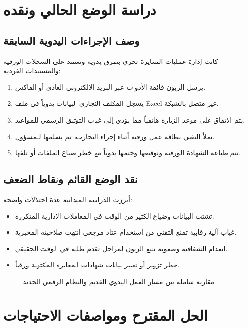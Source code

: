 \documentclass{bts-report-ar}
\begin{document}
\section{دراسة الوضع الحالي ونقده}
\subsection{وصف الإجراءات اليدوية السابقة}
كانت إدارة عمليات المعايرة تجري بطرق يدوية وتعتمد على السجلات الورقية والمستندات الفردية:
\begin{enumerate}
  \item يرسل الزبون قائمة الأدوات عبر البريد الإلكتروني العادي أو الفاكس.
  \item يسجل المكلف التجاري البيانات يدوياً في ملف Excel غير متصل بالشبكة.
  \item يتم الاتفاق على موعد الزيارة هاتفياً مما يؤدي إلى غياب التوثيق الرسمي للمواعيد.
  \item يملأ التقني بطاقة عمل ورقية أثناء إجراء التجارب، ثم يسلمها للمسؤول.
  \item تتم طباعة الشهادة الورقية وتوقيعها وختمها يدوياً مع خطر ضياع الملفات أو تلفها.
\end{enumerate}

\subsection{نقد الوضع القائم ونقاط الضعف}
أبرزت الدراسة الميدانية عدة اختلالات واضحة:
\begin{itemize}
  \item تشتت البيانات وضياع الكثير من الوقت في المعاملات الإدارية المتكررة.
  \item غياب آلية رقابية تمنع التقني من استخدام عتاد مرجعي انتهت صلاحيته المخبرية.
  \item انعدام الشفافية وصعوبة تتبع الزبون لمراحل تقدم طلبه في الوقت الحقيقي.
  \item خطر تزوير أو تغيير بيانات شهادات المعايرة المكتوبة ورقياً.
\end{itemize}

\begin{figure}[H]
  \centering
  \begin{LTR}
  
  \end{LTR}
  \caption{مقارنة شاملة بين مسار العمل اليدوي القديم والنظام الرقمي الجديد}
  \label{fig:process-comparison}
\end{figure}

\section{الحل المقترح ومواصفات الاحتياجات}
\end{document}
